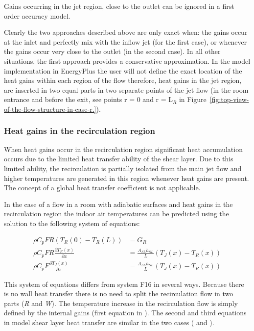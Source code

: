 {Gains occurring in the jet region, close to the outlet can be ignored in a first order accuracy model.

Clearly the two approaches described above are only exact when: the gains occur at the inlet and perfectly mix with the inflow jet (for the first case), or whenever the gains occur very close to the outlet (in the second case). In all other situations, the first approach provides a conservative approximation. In the model implementation in EnergyPlus the user will not define the exact location of the heat gains within each region of the flow therefore, heat gains in the jet region, are inserted in two equal parts in two separate points of the jet flow (in the room entrance and before the exit, see points r = 0 and r = L\(_{R}\) in Figure~\ref{fig:top-view-of-the-flow-structure-in-case-r.}).

\subsubsection{Heat gains in the recirculation region}\label{heat-gains-in-the-recirculation-region}

When heat gains occur in the recirculation region significant heat accumulation occurs due to the limited heat transfer ability of the shear layer. Due to this limited ability, the recirculation is partially isolated from the main jet flow and higher temperatures are generated in this region whenever heat gains are present. The concept of a global heat transfer coefficient is not applicable.

In the case of a flow in a room with adiabatic surfaces and heat gains in the recirculation region the indoor air temperatures can be predicted using the solution to the following system of equations:

\begin{equation}
  \begin{array}{rl}
    \rho C_p F R \left(T_R\left(0\right) - T_R\left(L\right)\right) & = G_R \\
    \rho C_p F R \frac{\partial T_R \left(x\right)}{\partial x} & = \frac{A_{SL} h_{SL}}{L} \left(T_J\left(x\right) - T_R \left(x\right)\right) \\
    \rho C_p F \frac{\partial T_J \left(x\right)}{\partial x} & = \frac{A_{SL} h_{SL}}{L} \left(T_J\left(x\right) - T_R \left(x\right)\right)
  \end{array}
\end{equation}

This system of equations differs from system F16 in several ways. Because there is no wall heat transfer there is no need to split the recirculation flow in two parts (\emph{R} and \emph{W}). The temperature increase in the recirculation flow is simply defined by the internal gains (first equation in ). The second and third equations in model shear layer heat transfer are similar in the two cases ( and ).

}
